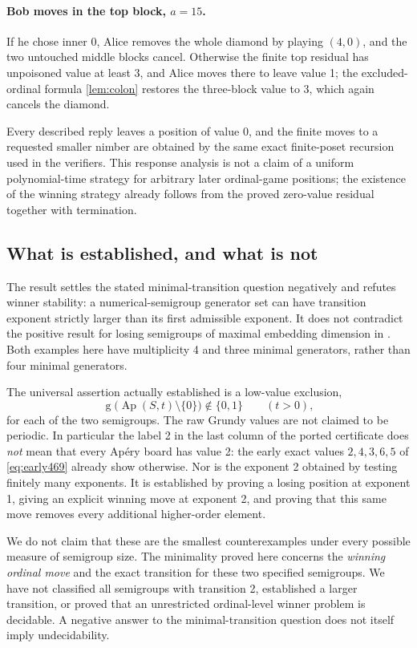 \documentclass[11pt,letterpaper]{article}
\numberwithin{equation}{section}
\theoremstyle{definition}
\theoremstyle{remark}
\newcommand{\sg}{\operatorname{g}}
\newcommand{\Ap}{\operatorname{Ap}}
\begin{document}
\paragraph{Bob moves in the top block, $a=15$.}
If he chose inner 0, Alice removes the whole diamond by playing $(4,0)$,
and the two untouched middle blocks cancel. Otherwise the finite top
residual has unpoisoned value at least 3, and Alice moves there to leave
value 1; the excluded-ordinal formula \cref{lem:colon} restores the
three-block value to 3, which again cancels the diamond.

Every described reply leaves a position of value 0, and the finite moves
to a requested smaller nimber are obtained by the same exact finite-poset
recursion used in the verifiers. This response analysis is not a claim of
a uniform polynomial-time strategy for arbitrary later ordinal-game
positions; the existence of the winning strategy already follows from the
proved zero-value residual together with termination.

\subsection{What is established, and what is not}
\label{sec:scope}

The result settles the stated minimal-transition question negatively and
refutes winner stability: a numerical-semigroup generator set can have
transition exponent strictly larger than its first admissible exponent.
It does not contradict the positive result for losing semigroups of
maximal embedding dimension in \cite[Proposition 4.2]{RH26}. Both
examples here have multiplicity 4 and three minimal generators, rather
than four minimal generators.

The universal assertion actually established is a low-value exclusion,
\[
 \sg\bigl(\Ap(S,t)\setminus\{0\}\bigr)\notin\{0,1\}\qquad(t>0),
\]
for each of the two semigroups. The raw Grundy values are not claimed to
be periodic. In particular the label 2 in the last column of the ported
certificate does \emph{not} mean that every Ap\'ery board has value 2:
the early exact values $2,4,3,6,5$ of \cref{eq:early469} already show
otherwise. Nor is the exponent 2 obtained by testing finitely many
exponents. It is established by proving a losing position at exponent 1,
giving an explicit winning move at exponent 2, and proving that this same
move removes every additional higher-order element.

We do not claim that these are the smallest counterexamples under every
possible measure of semigroup size. The minimality proved here concerns
the \emph{winning ordinal move} and the exact transition for these two
specified semigroups. We have not classified all semigroups with
transition 2, established a larger transition, or proved that an
unrestricted ordinal-level winner problem is decidable. A negative answer
to the minimal-transition question does not itself imply undecidability.
\end{document}
